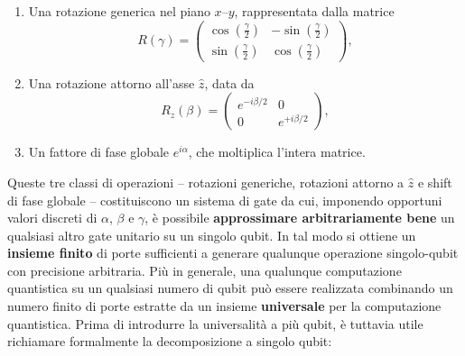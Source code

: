 \documentclass[a4paper,12pt]{report}
\theoremstyle{plain}
\begin{document}
\begin{enumerate}
    \item Una rotazione generica nel piano $x$--$y$, rappresentata dalla matrice
    \begin{equation}
    R(\gamma) = \begin{pmatrix}
        \cos(\tfrac{\gamma}{2}) & -\sin(\tfrac{\gamma}{2}) \\
        \sin(\tfrac{\gamma}{2}) & \cos(\tfrac{\gamma}{2})
    \end{pmatrix},
    \end{equation}
    
    \item Una rotazione attorno all'asse $\hat{z}$, data da
    \begin{equation}
    R_z(\beta) = \begin{pmatrix}
        e^{-i\beta/2} & 0 \\
        0 & e^{+i\beta/2}
    \end{pmatrix},
    \end{equation}
    
    \item Un fattore di fase globale $e^{i\alpha}$, che moltiplica l'intera matrice.
\end{enumerate}
Queste tre classi di operazioni -- rotazioni generiche, rotazioni attorno a $\hat{z}$ e shift di fase globale -- costituiscono un sistema di gate da cui, imponendo opportuni valori discreti di $\alpha$, $\beta$ e $\gamma$, è possibile \textbf{approssimare arbitrariamente bene} un qualsiasi altro gate unitario su un singolo qubit. In tal modo si ottiene un \textbf{insieme finito} di porte sufficienti a generare qualunque operazione singolo-qubit con precisione arbitraria.
Più in generale, una qualunque computazione quantistica su un qualsiasi numero di qubit può essere realizzata combinando un numero finito di porte estratte da un insieme \textbf{universale} per la computazione quantistica. Prima di introdurre la universalità a più qubit, è tuttavia utile richiamare formalmente la decomposizione a singolo qubit:
\end{document}
